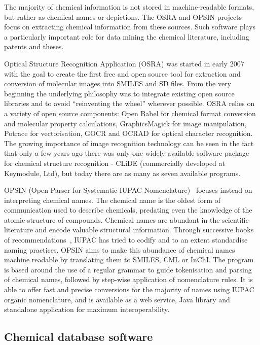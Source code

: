 \documentclass[10pt]{bmc_article}
\newenvironment{bmcformat}{\begin{raggedright}\baselineskip20pt\sloppy\setboolean{publ}{false}}{\end{raggedright}\baselineskip20pt\sloppy}
\begin{document}
\begin{bmcformat}
The majority of chemical information is not stored in machine-readable
formats, but rather as chemical names or depictions. The OSRA and OPSIN
projects focus on extracting chemical information from these sources.
Such software plays a particularly important role for data mining the
chemical literature, including patents and theses.

Optical Structure Recognition Application (OSRA) \cite{WebOSRA} was started
in early 2007 with the goal to create the first free and open source
tool for extraction and conversion of molecular images into SMILES and
SD files. From the very beginning the underlying philosophy was to integrate
existing open source libraries and to avoid ``reinventing the wheel''
wherever possible. OSRA relies on a variety of open source components:
Open Babel for chemical format
conversion and molecular property calculations, GraphicsMagick for image
manipulation, Potrace for vectorisation, GOCR and OCRAD for optical
character recognition. The growing importance of image
recognition technology can be seen in the fact that
only a few years ago there was only one widely available software
package for chemical structure recognition -  CLiDE (commercially
developed at Keymodule, Ltd), but today there are as many as seven
available programs.

OPSIN (Open Parser for Systematic IUPAC
Nomenclature)~\cite{lowe_chemical_2011} focuses instead on interpreting chemical names.
The chemical name is the oldest form of communication used to
describe chemicals, predating
even the knowledge of the atomic structure of compounds.
Chemical names are abundant in the scientific
literature and encode valuable structural information.
Through successive books of
recommendations~\cite{iupac_nomenclature_1979, iupac_guide_1993},
IUPAC has tried to codify and to an extent standardise naming practices.
OPSIN aims to make this abundance of
chemical names machine readable by translating them to SMILES, CML or
InChI. The program is based around the use of a regular grammar to
guide tokenisation and parsing of chemical names, followed by
step-wise application of nomenclature rules. It is able to offer
fast and precise conversions for the majority of names using IUPAC
organic nomenclature, and is available as a web service, Java
library and standalone application for maximum interoperability.

\subsection*{Chemical database software}


\end{bmcformat}
\end{document}
